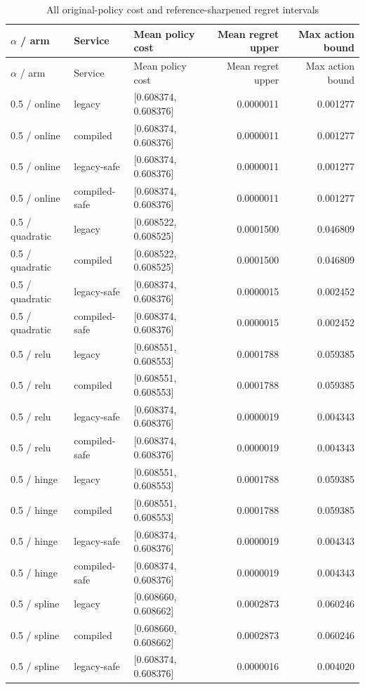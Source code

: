 \begingroup\scriptsize
\begin{longtable}{@{}lllrr@{}}\caption{All original-policy cost and reference-sharpened regret intervals}\\
\toprule $\alpha$ / arm & Service & Mean policy cost & Mean regret upper & Max action bound\\\midrule\endfirsthead
\toprule $\alpha$ / arm & Service & Mean policy cost & Mean regret upper & Max action bound\\\midrule\endhead
0.5 / online & legacy & [0.608374, 0.608376] & 0.0000011 & 0.001277\\
0.5 / online & compiled & [0.608374, 0.608376] & 0.0000011 & 0.001277\\
0.5 / online & legacy-safe & [0.608374, 0.608376] & 0.0000011 & 0.001277\\
0.5 / online & compiled-safe & [0.608374, 0.608376] & 0.0000011 & 0.001277\\
0.5 / quadratic & legacy & [0.608522, 0.608525] & 0.0001500 & 0.046809\\
0.5 / quadratic & compiled & [0.608522, 0.608525] & 0.0001500 & 0.046809\\
0.5 / quadratic & legacy-safe & [0.608374, 0.608376] & 0.0000015 & 0.002452\\
0.5 / quadratic & compiled-safe & [0.608374, 0.608376] & 0.0000015 & 0.002452\\
0.5 / relu & legacy & [0.608551, 0.608553] & 0.0001788 & 0.059385\\
0.5 / relu & compiled & [0.608551, 0.608553] & 0.0001788 & 0.059385\\
0.5 / relu & legacy-safe & [0.608374, 0.608376] & 0.0000019 & 0.004343\\
0.5 / relu & compiled-safe & [0.608374, 0.608376] & 0.0000019 & 0.004343\\
0.5 / hinge & legacy & [0.608551, 0.608553] & 0.0001788 & 0.059385\\
0.5 / hinge & compiled & [0.608551, 0.608553] & 0.0001788 & 0.059385\\
0.5 / hinge & legacy-safe & [0.608374, 0.608376] & 0.0000019 & 0.004343\\
0.5 / hinge & compiled-safe & [0.608374, 0.608376] & 0.0000019 & 0.004343\\
0.5 / spline & legacy & [0.608660, 0.608662] & 0.0002873 & 0.060246\\
0.5 / spline & compiled & [0.608660, 0.608662] & 0.0002873 & 0.060246\\
0.5 / spline & legacy-safe & [0.608374, 0.608376] & 0.0000016 & 0.004020\\

\end{longtable}
